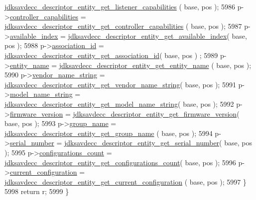 \begin{DoxyCode}
      \hyperlink{group__descriptor__entity_gac130520aa287ef74c805c057fbcd556b}{jdksavdecc\_descriptor\_entity\_get\_listener\_capabilities}
      ( base, pos );
5986         p->\hyperlink{structjdksavdecc__descriptor__entity_a66f07a4a428e308f20990a0e6bbfea0c}{controller\_capabilities} = 
      \hyperlink{group__descriptor__entity_ga46014717b51ae8ba2e1e0e7da380025f}{jdksavdecc\_descriptor\_entity\_get\_controller\_capabilities}
      ( base, pos );
5987         p->\hyperlink{structjdksavdecc__descriptor__entity_abbe4a72641a81cba6569feb1a446d431}{available\_index} = 
      \hyperlink{group__descriptor__entity_gaf5a970ec284e76b45d98797daacc2948}{jdksavdecc\_descriptor\_entity\_get\_available\_index}( base, pos
       );
5988         p->\hyperlink{structjdksavdecc__descriptor__entity_a0fa49c5118429af7a5ee7d71eada7b94}{association\_id} = 
      \hyperlink{group__descriptor__entity_gac34011786f9cc4d91f3a67f350d488c1}{jdksavdecc\_descriptor\_entity\_get\_association\_id}( base, pos )
      ;
5989         p->\hyperlink{structjdksavdecc__descriptor__entity_a4aea558819a980a1e6ab23e3fef33151}{entity\_name} = \hyperlink{group__descriptor__entity_ga6989438f225ed096ba558bf0f56e571f}{jdksavdecc\_descriptor\_entity\_get\_entity\_name}
      ( base, pos );
5990         p->\hyperlink{structjdksavdecc__descriptor__entity_a549d6f7287556a7baa0df2a68065e602}{vendor\_name\_string} = 
      \hyperlink{group__descriptor__entity_ga397d7c53568d8b606ba5342461faa252}{jdksavdecc\_descriptor\_entity\_get\_vendor\_name\_string}( 
      base, pos );
5991         p->\hyperlink{structjdksavdecc__descriptor__entity_a1c25086c94b5d1fd63d77b5eaa4ccd74}{model\_name\_string} = 
      \hyperlink{group__descriptor__entity_gadcff92a34872a1eadabfa541a0217b5e}{jdksavdecc\_descriptor\_entity\_get\_model\_name\_string}( base,
       pos );
5992         p->\hyperlink{structjdksavdecc__descriptor__entity_a31689a4dc44469797d55d47ac09c66fc}{firmware\_version} = 
      \hyperlink{group__descriptor__entity_ga83b63c5c1c1513a3743386fc6914911f}{jdksavdecc\_descriptor\_entity\_get\_firmware\_version}( base, 
      pos );
5993         p->\hyperlink{structjdksavdecc__descriptor__entity_aec617f41572a72825fc2cc6a4a150c59}{group\_name} = \hyperlink{group__descriptor__entity_gace7a1e53c9a194cfde161de55ad00e3b}{jdksavdecc\_descriptor\_entity\_get\_group\_name}
      ( base, pos );
5994         p->\hyperlink{structjdksavdecc__descriptor__entity_a3cf7494988985903d75b67aef67976d5}{serial\_number} = 
      \hyperlink{group__descriptor__entity_gae50c8c6e7a521b7cd693b2433e1f9e57}{jdksavdecc\_descriptor\_entity\_get\_serial\_number}( base, pos );
5995         p->\hyperlink{structjdksavdecc__descriptor__entity_acd98c5a873e9714692b16260d1e9ea0f}{configurations\_count} = 
      \hyperlink{group__descriptor__entity_gad0ec7e94eb9500a30d558230e4adbd12}{jdksavdecc\_descriptor\_entity\_get\_configurations\_count}(
       base, pos );
5996         p->\hyperlink{structjdksavdecc__descriptor__entity_acbe7b9cc1c5e0e0f5f18fd0552641649}{current\_configuration} = 
      \hyperlink{group__descriptor__entity_ga92fc4030ec58a727c8c82a53e8f743e9}{jdksavdecc\_descriptor\_entity\_get\_current\_configuration}
      ( base, pos );
5997     \}
5998     \textcolor{keywordflow}{return} r;
5999 \}
\end{DoxyCode}


